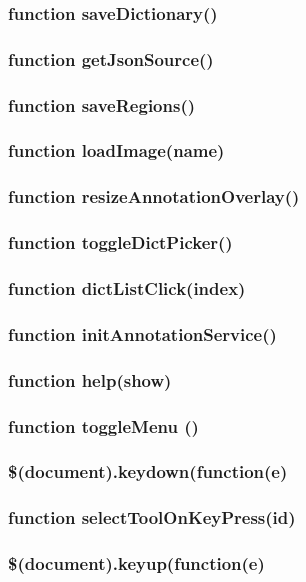 \subsubsection{function saveDictionary()}
\subsubsection{function getJsonSource()}
\subsubsection{function saveRegions()}

\subsubsection{function loadImage(name)}
\subsubsection{function resizeAnnotationOverlay()}


\subsubsection{function toggleDictPicker()}
\subsubsection{function dictListClick(index)}


\subsubsection{function initAnnotationService()}
\subsubsection{function help(show)}
\subsubsection{function toggleMenu ()}
\subsubsection{\$(document).keydown(function(e)}
\subsubsection{function selectToolOnKeyPress(id)}

\subsubsection{\$(document).keyup(function(e)}
